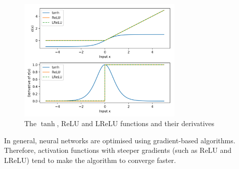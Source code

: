 	\begin{figure}[H]
		\centering
		\includegraphics[width=0.7\textwidth]{graphics/nns/activations}
		
		\caption[Activation functions]{The $\tanh$, ReLU and LReLU functions and their derivatives}
		\label{Fig: prep/ml/mlp/activations}
	\end{figure}
	In general, neural networks are optimised using gradient-based algorithms. Therefore, activation functions with steeper gradients (such as ReLU and LReLU) tend to make the algorithm to converge faster.
	
